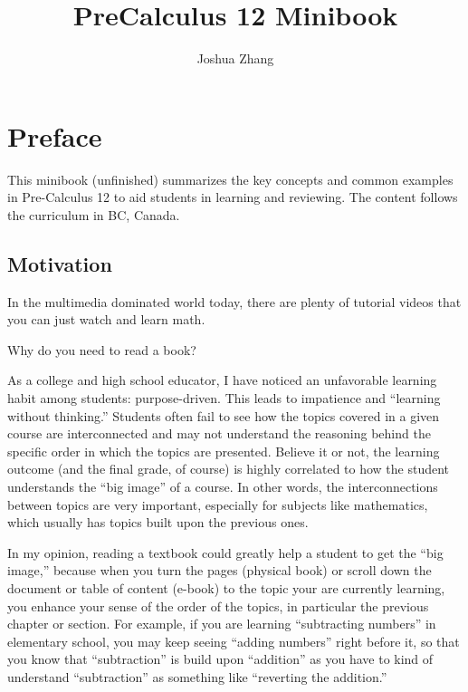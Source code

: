\documentclass[
]{book}
\title{PreCalculus 12 Minibook}
\author{Joshua Zhang}
\date{}
\theoremstyle{definition}
\theoremstyle{definition}
\theoremstyle{definition}
\theoremstyle{definition}
\theoremstyle{remark}
\begin{document}
\maketitle

{
\setcounter{tocdepth}{1}
\tableofcontents
}
\hypertarget{preface}{%
\chapter*{Preface}\label{preface}}

This minibook (unfinished) summarizes the key concepts and common examples in Pre-Calculus 12 to aid students in learning and reviewing. The content follows the curriculum in BC, Canada.

\hypertarget{motivation}{%
\section*{Motivation}\label{motivation}}

In the multimedia dominated world today, there are plenty of tutorial videos that you can just watch and learn math.

Why do you need to read a book?

As a college and high school educator, I have noticed an unfavorable learning habit among students: purpose-driven. This leads to impatience and ``learning without thinking.'' Students often fail to see how the topics covered in a given course are interconnected and may not understand the reasoning behind the specific order in which the topics are presented. Believe it or not, the learning outcome (and the final grade, of course) is highly correlated to how the student understands the ``big image'' of a course. In other words, the interconnections between topics are very important, especially for subjects like mathematics, which usually has topics built upon the previous ones.

In my opinion, reading a textbook could greatly help a student to get the ``big image,'' because when you turn the pages (physical book) or scroll down the document or table of content (e-book) to the topic your are currently learning, you enhance your sense of the order of the topics, in particular the previous chapter or section. For example, if you are learning ``subtracting numbers'' in elementary school, you may keep seeing ``adding numbers'' right before it, so that you know that ``subtraction'' is build upon ``addition'' as you have to kind of understand ``subtraction'' as something like ``reverting the addition.''
\end{document}
